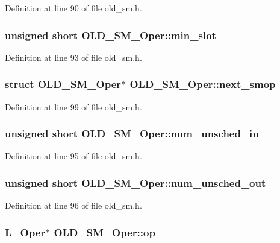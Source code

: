 Definition at line 90 of file old\_\-sm.h.
\subsubsection{\setlength{\rightskip}{0pt plus 5cm}unsigned short \bf{OLD\_\-SM\_\-Oper::min\_\-slot}}\label{structOLD__SM__Oper_c8e97c8f0a0ad1b05169ddd33aa24e98}




Definition at line 93 of file old\_\-sm.h.
\subsubsection{\setlength{\rightskip}{0pt plus 5cm}struct \bf{OLD\_\-SM\_\-Oper}$\ast$ \bf{OLD\_\-SM\_\-Oper::next\_\-smop}}\label{structOLD__SM__Oper_143e31736bf57214c1dd50ce2e72d540}




Definition at line 99 of file old\_\-sm.h.
\subsubsection{\setlength{\rightskip}{0pt plus 5cm}unsigned short \bf{OLD\_\-SM\_\-Oper::num\_\-unsched\_\-in}}\label{structOLD__SM__Oper_46c69482dd0c63557c2b3dd06a21633a}




Definition at line 95 of file old\_\-sm.h.
\subsubsection{\setlength{\rightskip}{0pt plus 5cm}unsigned short \bf{OLD\_\-SM\_\-Oper::num\_\-unsched\_\-out}}\label{structOLD__SM__Oper_a2954d41856be48e72add9acbdcf6363}




Definition at line 96 of file old\_\-sm.h.
\subsubsection{\setlength{\rightskip}{0pt plus 5cm}L\_\-Oper$\ast$ \bf{OLD\_\-SM\_\-Oper::op}}\label{structOLD__SM__Oper_a8657698fb3cd8c02793e0db7079aba4}




